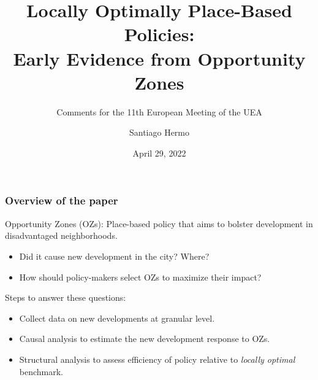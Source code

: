\documentclass[aspectratio=169, t]{beamer}
\title{Locally Optimally Place-Based Policies: \\ 
       Early Evidence from Opportunity Zones}
\subtitle{\vspace{3mm} Comments for the 11th European Meeting of the UEA}
\date{April 29, 2022}
\author{Santiago Hermo\vspace{-3mm} }
\institute{Brown University}
\begin{document}
\maketitle



\begin{frame}
    \frametitle{Overview of the paper}
    
    Opportunity Zones (OZs): Place-based policy that aims to bolster development in disadvantaged neighborhoods.
    \begin{itemize}
        \item Did it cause new development in the city? Where?
        \item How should policy-makers select OZs to maximize their impact?
    \end{itemize}
    
    \pause
    \vspace{4mm}
    Steps to answer these questions:
    \begin{itemize}
        \item Collect data on new developments at granular level.
        \item Causal analysis to estimate the new development response to OZs.
        \item Structural analysis to assess efficiency of policy relative to \textit{locally optimal} benchmark.
    \end{itemize}

\end{frame}
\end{document}
